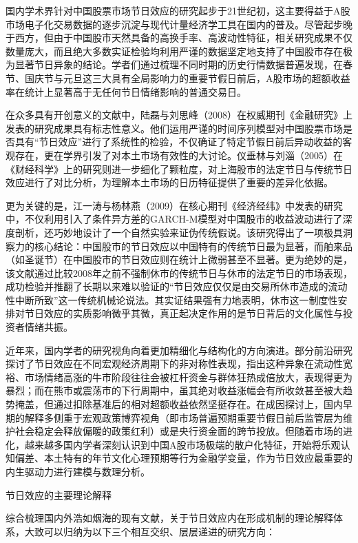 \documentclass{cupb-thesis}
\begin{document}
国内学术界针对中国股票市场节日效应的研究起步于21世纪初，这主要得益于A股市场电子化交易数据的逐步沉淀与现代计量经济学工具在国内的普及。尽管起步晚于西方，但由于中国股市天然具备的高换手率、高波动性特征，相关研究成果不仅数量庞大，而且绝大多数实证检验均利用严谨的数据坚定地支持了中国股市存在极为显著节日异象的结论。学者们通过梳理不同时期的历史行情数据普遍发现，在春节、国庆节与元旦这三大具有全局影响力的重要节假日前后，A股市场的超额收益率在统计上显著高于无任何节日情绪影响的普通交易日。


在众多具有开创意义的文献中，陆磊与刘思峰（2008）在权威期刊《金融研究》上发表的研究成果具有标志性意义。他们运用严谨的时间序列模型对中国股票市场是否具有“节日效应”进行了系统性的检验，不仅确证了特定节假日前后异动收益的客观存在，更在学界引发了对本土市场有效性的大讨论。仪垂林与刘淄（2005）在《财经科学》上的研究则进一步细化了颗粒度，对上海股市的法定节日与传统节日效应进行了对比分析，为理解本土市场的日历特征提供了重要的差异化依据。


更为关键的是，江一涛与杨林燕（2009）在核心期刊《经济经纬》中发表的研究中，不仅利用引入了条件异方差的GARCH-M模型对中国股市的收益波动进行了深度剖析，还巧妙地设计了一个自然实验来证伪传统假说。该研究得出了一项极具洞察力的核心结论：中国股市的节日效应以中国特有的传统节日最为显著，而舶来品（如圣诞节）在中国股市的节日效应则在统计上微弱甚至不显著。更为绝妙的是，该文献通过比较2008年之前不强制休市的传统节日与休市的法定节日的市场表现，成功检验并推翻了长期以来难以验证的“节日效应仅仅是由交易所休市造成的流动性中断所致”这一传统机械论说法。其实证结果强有力地表明，休市这一制度性安排对节日效应的实质影响微乎其微，真正起决定作用的是节日背后的文化属性与投资者情绪共振。


近年来，国内学者的研究视角向着更加精细化与结构化的方向演进。部分前沿研究探讨了节日效应在不同宏观经济周期下的非对称性表现，指出这种异象在流动性宽裕、市场情绪高涨的牛市阶段往往会被杠杆资金与群体狂热成倍放大，表现得更为暴烈；而在熊市或震荡市的下行周期中，虽其绝对收益涨幅会有所收敛甚至被大趋势掩盖，但通过扣除基准后的相对超额收益依然坚挺存在。在成因探讨上，国内早期的解释多侧重于宏观政策博弈视角（即市场普遍预期重要节假日前后监管层为维护社会稳定会释放偏暖的政策红利）或是央行资金面的跨节投放。但随着市场的进化，越来越多国内学者深刻认识到中国A股市场极端的散户化特征，开始将乐观认知偏差、本土特有的年节文化心理预期等行为金融学变量，作为节日效应最重要的内生驱动力进行建模与数理分析。


节日效应的主要理论解释

综合梳理国内外浩如烟海的现有文献，关于节日效应内在形成机制的理论解释体系，大致可以归纳为以下三个相互交织、层层递进的研究方向：
\end{document}
